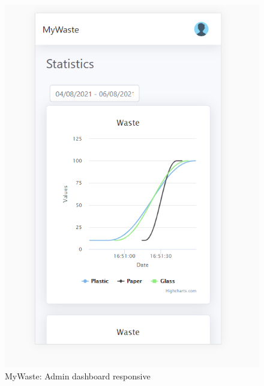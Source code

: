 \documentclass{report}
\begin{document}
\begin{figure}[h!]
    \begin{center}
        \includegraphics[width=1.0\textwidth]{images/adminDashboard_resp1.PNG}  \end{center}
    \caption{MyWaste: Admin dashboard responsive}
    \label{fig: respadmindash1}
\end{figure}
\end{document}
